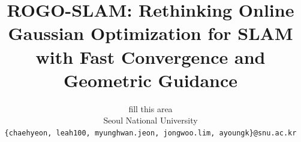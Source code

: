 \documentclass[10pt,twocolumn,letterpaper]{article}
\title{ROGO-SLAM: Rethinking Online Gaussian Optimization for SLAM with Fast Convergence and Geometric Guidance}
\author{fill this area\\
Seoul National University\\
{\tt\small \{chaehyeon, leah100, myunghwan.jeon, jongwoo.lim, ayoungk\}@snu.ac.kr}
}
\begin{document}
\maketitle




% 



{
    \small
    
    
}


\end{document}
